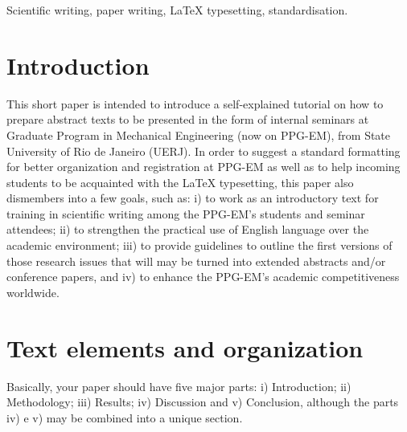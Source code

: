 \documentclass[date]{ppgem}
\begin{document}
\thispagestyle{plain}
\makeheader

\begin{multicols}{2}

\begin{keywords}
Scientific writing, paper writing, {\LaTeX} typesetting, standardisation.
\end{keywords}

\section{Introduction}

This short paper is intended to introduce a self-explained tutorial on how to prepare abstract texts to be presented in the form of internal seminars at Graduate Program in Mechanical Engineering (now on PPG-EM), from State University of Rio de Janeiro (UERJ). In order to suggest a standard formatting for better organization and registration at PPG-EM as well as to help incoming students to be acquainted with the {\LaTeX} typesetting, this paper also dismembers into a few goals, such as: i) to work as an introductory text for training in scientific writing among the PPG-EM's students and seminar attendees; ii) to strengthen the practical use of English language over the academic environment; iii) to provide guidelines to outline the first versions of those research issues that will may be turned into extended abstracts and/or conference papers, and iv) to enhance the PPG-EM's academic competitiveness worldwide. 

\section{Text elements and organization}

Basically, your paper should have five major parts: i) Introduction; ii) Methodology; iii) Results; iv) Discussion and v) Conclusion, although the parts iv) e v) may be combined into a unique section. 


\end{multicols}
\end{document}
